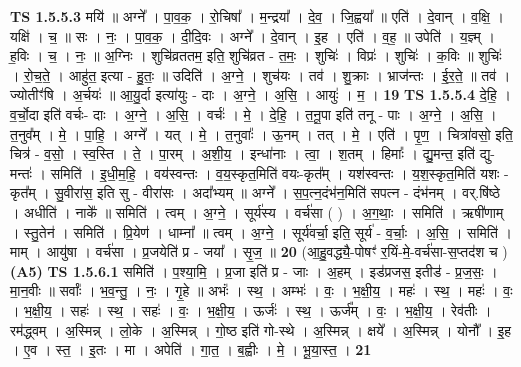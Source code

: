 \documentclass[17pt]{extarticle}
\begin{document}
                  \newline
                                \textbf{ TS 1.5.5.3} \newline
                  मयि॑ ॥ अग्ने᳚ । पा॒व॒क॒ । रो॒चिषा᳚ । म॒न्द्रया᳚ । दे॒व॒ । जि॒ह्वया᳚ ॥ एति॑ । दे॒वान् । व॒क्षि॒ । यक्षि॑ । च॒ ॥ सः । नः॒ । पा॒व॒क॒ । दी॒दि॒वः । अग्ने᳚ । दे॒वान् । इ॒ह । एति॑ । व॒ह॒ ॥ उपेति॑ । य॒ज्ञ्म् । ह॒विः । च॒ । नः॒ ॥ अ॒ग्निः । शुचि॑व्रततम॒ इति॒ शुचि॑व्रत - त॒मः॒ । शुचिः॑ । विप्रः॑ । शुचिः॑ । क॒विः ॥ शुचिः॑ । रो॒च॒ते॒ । आहु॑त॒ इत्या - हु॒तः॒ ॥ उदिति॑ । अ॒ग्ने॒ । शुच॑यः । तव॑ । शु॒क्राः । भ्राज॑न्तः । ई॒र॒ते॒ ॥ तव॑ । ज्योतीꣳ॑षि । अ॒र्चयः॑ ॥ आ॒यु॒र्दा इत्या॑युः - दाः । अ॒ग्ने॒ । अ॒सि॒ । आयुः॑ । म॒ । \textbf{  19} \newline
                  \newline
                                \textbf{ TS 1.5.5.4} \newline
                  दे॒हि॒ । व॒र्चो॒दा इति॑ वर्चः- दाः । अ॒ग्ने॒ । अ॒सि॒ । वर्चः॑ । मे॒ । दे॒हि॒ । त॒नू॒पा इति॑ तनू - पाः । अ॒ग्ने॒ । अ॒सि॒ । त॒नुव᳚म् । मे॒ । पा॒हि॒ । अग्ने᳚ । यत् । मे॒ । त॒नुवाः᳚ । ऊ॒नम् । तत् । मे॒ । एति॑ । पृ॒ण॒ । चित्रा॑वसो॒ इति॒ चित्र॑ - व॒सो॒ । स्व॒स्ति । ते॒ । पा॒रम् । अ॒शी॒य॒ । इन्धा॑नाः । त्वा॒ । श॒तम् । हिमाः᳚ । द्यु॒मन्त॒ इति॑ द्यु- मन्तः॑ । समिति॑ । इ॒धी॒म॒हि॒ । वय॑स्वन्तः । व॒य॒स्कृत॒मिति॑ वयः-कृत᳚म् । यश॑स्वन्तः । य॒श॒स्कृत॒मिति॑ यशः - कृत᳚म् । सु॒वीरा॑स॒ इति सु - वीरा॑सः । अदा᳚भ्यम् ॥ अग्ने᳚ । स॒प॒त्न॒दंभ॑न॒मिति॑ सपत्न - दंभ॑नम् । वर्.षि॑ष्ठे । अधीति॑ । नाके᳚ ॥ समिति॑ । त्वम् । अ॒ग्ने॒ । सूर्य॑स्य । वर्च॑सा ( ) । अ॒ग॒थाः॒ । समिति॑ । ऋषी॑णाम् । स्तु॒तेन॑ । समिति॑ । प्रि॒येण॑ । धाम्ना᳚ ॥ त्वम् । अ॒ग्ने॒ । सूर्य॑वर्चा॒ इति॒ सूर्य॑ - व॒र्चाः॒ । अ॒सि॒ । समिति॑ । माम् । आयु॑षा । वर्च॑सा । प्र॒जयेति॑ प्र - जया᳚ । सृ॒ज॒ ॥ \textbf{  20} \newline
                  \newline
                      (आ॒हु॒वद्ध्यै॒-पोषꣳ॑ र॒यिं-मे॒-वर्च॑सा-स॒प्तद॑श च )  \textbf{(A5)} \newline \newline
                                \textbf{ TS 1.5.6.1} \newline
                  समिति॑ । प॒श्या॒मि॒ । प्र॒जा इति॑ प्र - जाः । अ॒हम् । इड॑प्रजस॒ इतीड॑ - प्र॒ज॒सः॒ । मा॒न॒वीः ॥ सर्वाः᳚ । भ॒व॒न्तु॒ । नः॒ । गृ॒हे ॥ अभंः॑ । स्थ॒ । अम्भः॑ । वः॒ । भ॒क्षी॒य॒ । महः॑ । स्थ॒ । महः॑ । वः॒ । भ॒क्षी॒य॒ । सहः॑ । स्थ॒ । सहः॑ । वः॒ । भ॒क्षी॒य॒ । ऊर्जः॑ । स्थ॒ । ऊर्ज᳚म् । वः॒ । भ॒क्षी॒य॒ । रेव॑तीः । रम॑द्ध्वम् । अ॒स्मिन्न् । लो॒के । अ॒स्मिन्न् । गो॒ष्ठ इति॑ गो-स्थे । अ॒स्मिन्न् । क्षये᳚ । अ॒स्मिन्न् । योनौ᳚ । इ॒ह । ए॒व । स्त॒ । इ॒तः । मा । अपेति॑ । गा॒त॒ । ब॒ह्वीः । मे॒ । भू॒या॒स्त॒ । \textbf{  21} \newline
\end{document}
